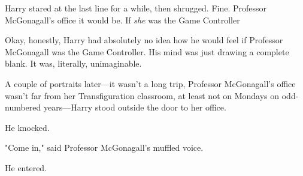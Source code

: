 Harry stared at the last line for a while, then shrugged. Fine. Professor
McGonagall's office it would be. If \emph{she} was the Game Controller{\el}

Okay, honestly, Harry had absolutely no idea how he would feel if Professor
McGonagall was the Game Controller. His mind was just drawing a complete blank.
It was, literally, unimaginable.

A couple of portraits later—it wasn't a long trip, Professor McGonagall's
office wasn't far from her Transfiguration classroom, at least not on Mondays
on odd-numbered years—Harry stood outside the door to her office.

He knocked.

"Come in," said Professor McGonagall's muffled voice.

He entered.
